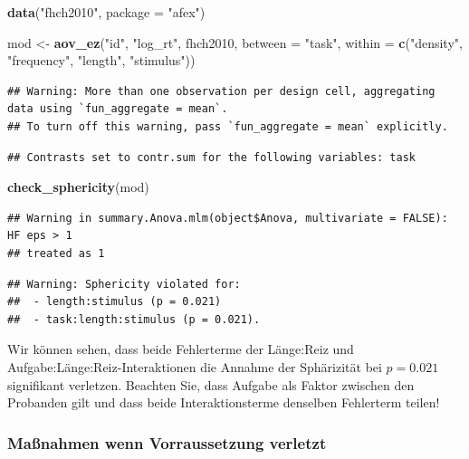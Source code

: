 \documentclass[
]{book}
\newenvironment{Shaded}{\begin{snugshade}}{\end{snugshade}}
\newcommand{\AttributeTok}[1]{\textcolor[rgb]{0.13,0.29,0.53}{#1}}
\newcommand{\FunctionTok}[1]{\textcolor[rgb]{0.13,0.29,0.53}{\textbf{#1}}}
\newcommand{\NormalTok}[1]{#1}
\newcommand{\OtherTok}[1]{\textcolor[rgb]{0.56,0.35,0.01}{#1}}
\newcommand{\StringTok}[1]{\textcolor[rgb]{0.31,0.60,0.02}{#1}}
\begin{document}
\begin{Shaded}
\begin{Highlighting}[]
\FunctionTok{data}\NormalTok{(}\StringTok{"fhch2010"}\NormalTok{, }\AttributeTok{package =} \StringTok{"afex"}\NormalTok{)}

\NormalTok{mod }\OtherTok{\textless{}{-}} \FunctionTok{aov\_ez}\NormalTok{(}\StringTok{"id"}\NormalTok{, }\StringTok{"log\_rt"}\NormalTok{, fhch2010,}
             \AttributeTok{between =} \StringTok{"task"}\NormalTok{, }
             \AttributeTok{within =} \FunctionTok{c}\NormalTok{(}\StringTok{"density"}\NormalTok{, }\StringTok{"frequency"}\NormalTok{, }\StringTok{"length"}\NormalTok{, }\StringTok{"stimulus"}\NormalTok{))}
\end{Highlighting}
\end{Shaded}

\begin{verbatim}
## Warning: More than one observation per design cell, aggregating data using `fun_aggregate = mean`.
## To turn off this warning, pass `fun_aggregate = mean` explicitly.
\end{verbatim}

\begin{verbatim}
## Contrasts set to contr.sum for the following variables: task
\end{verbatim}

\begin{Shaded}
\begin{Highlighting}[]
\FunctionTok{check\_sphericity}\NormalTok{(mod)}
\end{Highlighting}
\end{Shaded}

\begin{verbatim}
## Warning in summary.Anova.mlm(object$Anova, multivariate = FALSE): HF eps > 1
## treated as 1
\end{verbatim}

\begin{verbatim}
## Warning: Sphericity violated for: 
##  - length:stimulus (p = 0.021)
##  - task:length:stimulus (p = 0.021).
\end{verbatim}

Wir können sehen, dass beide Fehlerterme der Länge:Reiz und Aufgabe:Länge:Reiz-Interaktionen die Annahme der Sphärizität bei \(p = 0.021\) signifikant verletzen. Beachten Sie, dass Aufgabe als Faktor zwischen den Probanden gilt und dass beide Interaktionsterme denselben Fehlerterm teilen!

\subsubsection{Maßnahmen wenn Vorraussetzung verletzt}\label{mauxdfnahmen-wenn-vorraussetzung-verletzt-1}
\end{document}
